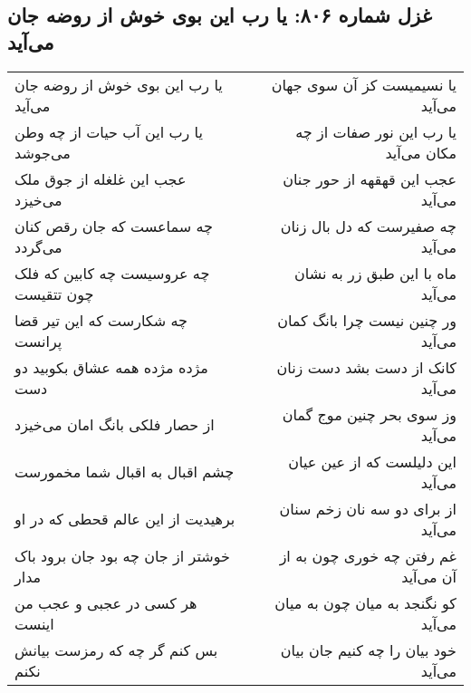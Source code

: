 \begin{center}
\section*{غزل شماره ۸۰۶: یا رب این بوی خوش از روضه جان می‌آید}
\label{sec:0806}
\begin{longtable}{l p{0.5cm} r}
یا رب این بوی خوش از روضه جان می‌آید
&&
یا نسیمیست کز آن سوی جهان می‌آید
\\
یا رب این آب حیات از چه وطن می‌جوشد
&&
یا رب این نور صفات از چه مکان می‌آید
\\
عجب این غلغله از جوق ملک می‌خیزد
&&
عجب این قهقهه از حور جنان می‌آید
\\
چه سماعست که جان رقص کنان می‌گردد
&&
چه صفیرست که دل بال زنان می‌آید
\\
چه عروسیست چه کابین که فلک چون تتقیست
&&
ماه با این طبق زر به نشان می‌آید
\\
چه شکارست که این تیر قضا پرانست
&&
ور چنین نیست چرا بانگ کمان می‌آید
\\
مژده مژده همه عشاق بکوبید دو دست
&&
کانک از دست بشد دست زنان می‌آید
\\
از حصار فلکی بانگ امان می‌خیزد
&&
وز سوی بحر چنین موج گمان می‌آید
\\
چشم اقبال به اقبال شما مخمورست
&&
این دلیلست که از عین عیان می‌آید
\\
برهیدیت از این عالم قحطی که در او
&&
از برای دو سه نان زخم سنان می‌آید
\\
خوشتر از جان چه بود جان برود باک مدار
&&
غم رفتن چه خوری چون به از آن می‌آید
\\
هر کسی در عجبی و عجب من اینست
&&
کو نگنجد به میان چون به میان می‌آید
\\
بس کنم گر چه که رمزست بیانش نکنم
&&
خود بیان را چه کنیم جان بیان می‌آید
\\
\end{longtable}
\end{center}
